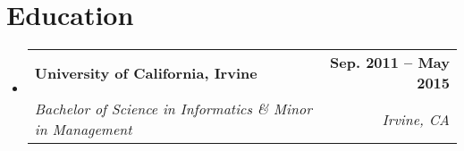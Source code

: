 \documentclass[letterpaper,12pt]{article}
\makeatletter
\newcommand{\resumeItem}[1]{
  \item\small{
    {#1 \vspace{1pt}}
  }
}
\newcommand{\resumeSubheading}[4]{
  \vspace{4pt}\item
    \begin{tabular*}{1.0\textwidth}[t]{l@{\extracolsep{\fill}}r}
      \textbf{#1} & \textbf{\small #2} \\
      \textit{\small#3} & \textit{\small #4} \\
    \end{tabular*}\vspace{-7pt}
}
\newcommand{\resumeSubHeadingListStart}{\begin{itemize}[leftmargin=0.0in, label={}]}
\newcommand{\resumeSubHeadingListEnd}{\end{itemize}}
\newcommand{\resumeItemListStart}{\begin{itemize}}
\newcommand{\resumeItemListEnd}{\end{itemize}\vspace{-5pt}}
\makeatother
\begin{document}
%


\section{Education}
  \resumeSubHeadingListStart
    \resumeSubheading
      {University of California, Irvine}{Sep. 2011 -- May 2015}
      {Bachelor of Science in Informatics \& Minor in Management}{Irvine, CA}
  \resumeSubHeadingListEnd



\end{document}
